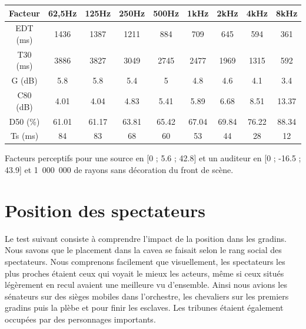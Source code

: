 \begin{tableth} 
 \begin{tabular}{| *{9}{c|}} 
 \hline 
 Facteur & 62,5Hz & 125Hz & 250Hz & 500Hz & 1kHz & 2kHz & 4kHz & 8kHz \\ 
 \hline 
 \hline 
\gls{EDT} (ms)& 1436& 1387& 1211& 884& 709& 645& 594& 361 \\ 
 \hline 
\gls{T30} (ms)& 3886& 3827& 3049& 2745& 2477& 1969& 1315& 592 \\ 
 \hline 
\gls{G} (dB)& 5.8& 5.8& 5.4& 5& 4.8& 4.6& 4.1& 3.4 \\ 
 \hline 
\gls{C80} (dB)& 4.01& 4.04& 4.83& 5.41& 5.89& 6.68& 8.51& 13.37 \\ 
 \hline 
\gls{D50} (\%)& 61.01& 61.17& 63.81& 65.42& 67.04& 69.84& 76.22& 88.34 \\ 
 \hline 
\gls{Ts} (ms)& 84& 83& 68& 60& 53& 44& 28& 12 \\ 
 \hline 
\end{tabular} 
 \caption{Facteurs perceptifs pour une source en [0 ; 5.6 ; 42.8] et un auditeur en [0 ; -16.5 ; 43.9] et 1~000~000 de rayons sans décoration du front de scène.} 
 \label{tab_fact_sansdec} 
 \end{tableth}


\section{Position des spectateurs} \label{sect_positionSpectateur}
Le test suivant consiste à comprendre l'impact de la position dans les gradins. Nous savons que le placement dans la \gls{cavea} se faisait selon le rang social des spectateurs. Nous comprenons facilement que visuellement, les spectateurs les plus proches étaient ceux qui voyait le mieux les acteurs, même si ceux situés légèrement en recul avaient une meilleure vu d'ensemble. Ainsi nous avions les sénateurs sur des sièges mobiles dans l'orchestre, les chevaliers sur les premiers gradins puis la plèbe et pour finir les esclaves. Les tribunes étaient également occupées par des personnages importants.


